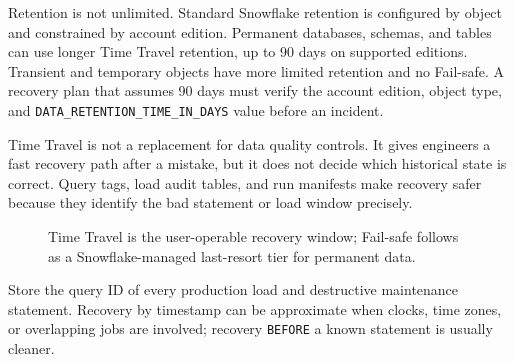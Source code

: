 Retention is not unlimited. Standard Snowflake retention is configured by object and constrained by account edition. Permanent databases, schemas, and tables can use longer Time Travel retention, up to 90 days on supported editions. Transient and temporary objects have more limited retention and no Fail-safe. A recovery plan that assumes 90 days must verify the account edition, object type, and \texttt{DATA\_RETENTION\_TIME\_IN\_DAYS} value before an incident.
\begin{notebox}
Time Travel is not a replacement for data quality controls. It gives engineers a fast recovery path after a mistake, but it does not decide which historical state is correct. Query tags, load audit tables, and run manifests make recovery safer because they identify the bad statement or load window precisely.
\end{notebox}
\begin{figure}[H]
    \centering
    \caption{Time Travel is the user-operable recovery window; Fail-safe follows as a Snowflake-managed last-resort tier for permanent data.}
    \label{fig:chapter4-retention-timeline}
\end{figure}
\begin{tipbox}
Store the query ID of every production load and destructive maintenance statement. Recovery by timestamp can be approximate when clocks, time zones, or overlapping jobs are involved; recovery \texttt{BEFORE} a known statement is usually cleaner.
\end{tipbox}
